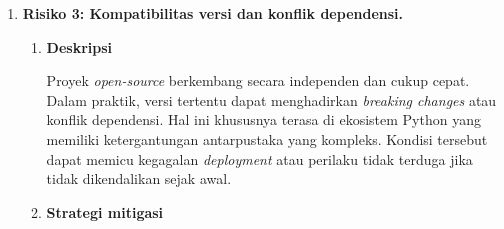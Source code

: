 \begin{enumerate}
\begin{enumerate}[label=\alph*)]
        Menjalankan platform MLOps yang relatif lengkap pada sumber daya terbatas berpotensi memicu perebutan sumber daya sehingga kinerja menurun atau terjadi \textit{out-of-memory}. \textcite{lakka2025kubernetes} menegaskan bahwa manajemen sumber daya dan desain skalabilitas yang tepat merupakan faktor penting pada lingkungan Kubernetes, terutama ketika banyak komponen ditempatkan dalam satu klaster.
        
        \vspace{0.5em}
        
        \item \textbf{Strategi mitigasi}
        
        Mitigasi dilakukan dengan menyesuaikan ukuran \textit{deployment} dengan kapasitas nyata yang tersedia. Layanan nonkritis dijalankan menggunakan konfigurasi \textit{lightweight}, dan \textit{resource requests} serta \textit{limits} diterapkan di setiap \textit{pod} untuk mencegah satu komponen menghabiskan seluruh sumber daya. Pemantauan CPU, memori, dan I/O melalui Prometheus dan Grafana digunakan untuk mendeteksi \textit{bottleneck} lebih awal. Ukuran \textit{dataset} sampel disesuaikan agar tetap representatif tanpa terlalu membebani sistem, dan bila diperlukan dimanfaatkan kredit \textit{cloud} gratis atau infrastruktur tambahan untuk uji beban tertentu.
        
        \vspace{0.5em}
    \end{enumerate}
    
    \item \textbf{Risiko 3: Kompatibilitas versi dan konflik dependensi.}
    
    \vspace{0.5em}
    \begin{enumerate}[label=\alph*)]
        \item \textbf{Deskripsi}
        
        Proyek \textit{open-source} berkembang secara independen dan cukup cepat. Dalam praktik, versi tertentu dapat menghadirkan \textit{breaking changes} atau konflik dependensi. Hal ini khususnya terasa di ekosistem Python yang memiliki ketergantungan antarpustaka yang kompleks. Kondisi tersebut dapat memicu kegagalan \textit{deployment} atau perilaku tidak terduga jika tidak dikendalikan sejak awal.
        
        \vspace{0.5em}
        
        \item \textbf{Strategi mitigasi}
        

\end{enumerate}
\end{enumerate}
